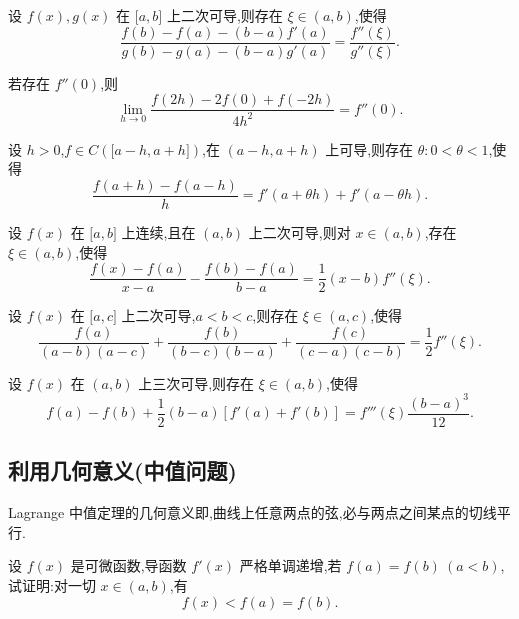 \documentclass[../数学分析培优讲义.tex]{subfiles}
\begin{document}
\begin{example}
设 $f(x),g(x)$ 在 $\lbrack a,b\rbrack$ 上二次可导,则存在 $\xi\in(a,b)$,使得
\[
    \dfrac{f(b)-f(a)-(b-a)f'(a)}{g(b)-g(a)-(b-a)g'(a)}
    =\dfrac{f''(\xi)}{g''(\xi)}.
\]
\end{example}
\exampleblank

\begin{example}
若存在 $f''(0)$,则
\[
    \lim\limits_{h\to0}
    \dfrac{f(2h)-2f(0)+f(-2h)}{4h^2}
    =f''(0).
\]
\end{example}
\exampleblank

\begin{example}
设 $h>0$,$f\in C(\lbrack a-h,a+h\rbrack)$,在 $(a-h,a+h)$ 上可导,则存在 $\theta:0<\theta<1$,使得
\[
    \dfrac{f(a+h)-f(a-h)}{h}
    =f'(a+\theta h)+f'(a-\theta h).
\]
\end{example}
\exampleblank

\begin{example}
设 $f(x)$ 在 $\lbrack a,b\rbrack$ 上连续,且在 $(a,b)$ 上二次可导,则对 $x\in(a,b)$,存在 $\xi\in(a,b)$,使得
\[
    \dfrac{f(x)-f(a)}{x-a}
    -\dfrac{f(b)-f(a)}{b-a}
    =\dfrac{1}{2}(x-b)f''(\xi).
\]
\end{example}
\exampleblank

\begin{example}
设 $f(x)$ 在 $\lbrack a,c\rbrack$ 上二次可导,$a<b<c$,则存在 $\xi\in(a,c)$,使得
\[
    \dfrac{f(a)}{(a-b)(a-c)}
    +\dfrac{f(b)}{(b-c)(b-a)}
    +\dfrac{f(c)}{(c-a)(c-b)}
    =\dfrac{1}{2}f''(\xi).
\]
\end{example}
\exampleblank

\begin{example}
设 $f(x)$ 在 $(a,b)$ 上三次可导,则存在 $\xi\in(a,b)$,使得
\[
    f(a)-f(b)+\dfrac{1}{2}(b-a)[f'(a)+f'(b)]
    =f'''(\xi)\dfrac{(b-a)^3}{12}.
\]
\end{example}
\exampleblank


\newpage

\subsection{利用几何意义(中值问题)}

Lagrange 中值定理的几何意义即,曲线上任意两点的弦,必与两点之间某点的切线平行.

\begin{example}
设 $f(x)$ 是可微函数,导函数 $f'(x)$ 严格单调递增,若 $f(a)=f(b)\ (a<b)$,试证明:对一切 $x\in(a,b)$,有
\[
    f(x)<f(a)=f(b).
\]
\end{example}
\exampleblank
\end{document}
